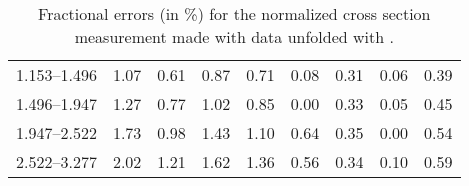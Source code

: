 \begin{table}
\begin{center}
\begin{tabular}{@{}l l l l l l l l l@{}}
            1.153--1.496    &  1.07   &  0.61   &  0.87         &  0.71      &  0.08    &  0.31  &  0.06       &  0.39  \\
            1.496--1.947    &  1.27   &  0.77   &  1.02         &  0.85      &  0.00    &  0.33  &  0.05       &  0.45  \\
            1.947--2.522    &  1.73   &  0.98   &  1.43         &  1.10      &  0.64    &  0.35  &  0.00       &  0.54  \\
            2.522--3.277    &  2.02   &  1.21   &  1.62         &  1.36      &  0.56    &  0.34  &  0.10       &  0.59  \\
            \bottomrule
        \end{tabular}
    \end{center}
    \caption[
        Fractional errors for the normalized cross section measurement
        made with data unfolded with \MADGRAPH.
    ]{
        Fractional errors (in \%) for the normalized cross section measurement
        made with data unfolded with \MADGRAPH.
    }
    \label{tab:sys_uncert_norm}
\end{table}

